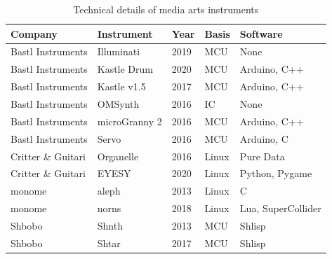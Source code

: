 \begin{table}[ht]
    \centering
    \begin{tabular}{ | l |  l | l | l | l |}
        \hline
        Company             & Instrument    & Year  & Basis & Software            \\
        \hline
        Bastl Instruments   & Illuminati    & 2019  & MCU       & None                \\
        Bastl Instruments   & Kastle Drum   & 2020  & MCU       & Arduino, C++        \\
        Bastl Instruments   & Kastle v1.5   & 2017  & MCU       & Arduino, C++        \\
        Bastl Instruments   & OMSynth       & 2016  & IC        & None                \\
        Bastl Instruments   & microGranny 2 & 2016  & MCU       & Arduino, C++        \\
        Bastl Instruments   & Servo         & 2016  & MCU       & Arduino, C          \\
        Critter \& Guitari  & Organelle     & 2016  & Linux     & Pure Data           \\
        Critter \& Guitari  & EYESY         & 2020  & Linux     & Python, Pygame      \\
        monome              & aleph         & 2013  & Linux     & C                   \\
        monome              & norns         & 2018  & Linux     & Lua, SuperCollider  \\
        Shbobo              & Shnth         & 2013  & MCU       & Shlisp              \\
        Shbobo              & Shtar         & 2017  & MCU       & Shlisp              \\
        \hline
    \end{tabular}
    \caption{Technical details of media arts instruments}
    \label{table:media-arts-instruments-technical}
\end{table}{}

